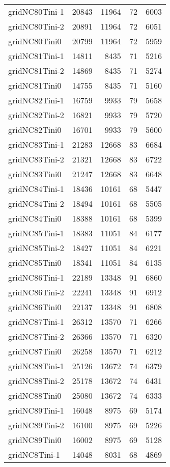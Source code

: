 \begin{longtable}{lrrrr}
gridNC80Tini-1 & 20843 & 11964 & 72 & 6003 \\
gridNC80Tini-2 & 20891 & 11964 & 72 & 6051 \\
gridNC80Tini0 & 20799 & 11964 & 72 & 5959 \\
gridNC81Tini-1 & 14811 & 8435 & 71 & 5216 \\
gridNC81Tini-2 & 14869 & 8435 & 71 & 5274 \\
gridNC81Tini0 & 14755 & 8435 & 71 & 5160 \\
gridNC82Tini-1 & 16759 & 9933 & 79 & 5658 \\
gridNC82Tini-2 & 16821 & 9933 & 79 & 5720 \\
gridNC82Tini0 & 16701 & 9933 & 79 & 5600 \\
gridNC83Tini-1 & 21283 & 12668 & 83 & 6684 \\
gridNC83Tini-2 & 21321 & 12668 & 83 & 6722 \\
gridNC83Tini0 & 21247 & 12668 & 83 & 6648 \\
gridNC84Tini-1 & 18436 & 10161 & 68 & 5447 \\
gridNC84Tini-2 & 18494 & 10161 & 68 & 5505 \\
gridNC84Tini0 & 18388 & 10161 & 68 & 5399 \\
gridNC85Tini-1 & 18383 & 11051 & 84 & 6177 \\
gridNC85Tini-2 & 18427 & 11051 & 84 & 6221 \\
gridNC85Tini0 & 18341 & 11051 & 84 & 6135 \\
gridNC86Tini-1 & 22189 & 13348 & 91 & 6860 \\
gridNC86Tini-2 & 22241 & 13348 & 91 & 6912 \\
gridNC86Tini0 & 22137 & 13348 & 91 & 6808 \\
gridNC87Tini-1 & 26312 & 13570 & 71 & 6266 \\
gridNC87Tini-2 & 26366 & 13570 & 71 & 6320 \\
gridNC87Tini0 & 26258 & 13570 & 71 & 6212 \\
gridNC88Tini-1 & 25126 & 13672 & 74 & 6379 \\
gridNC88Tini-2 & 25178 & 13672 & 74 & 6431 \\
gridNC88Tini0 & 25080 & 13672 & 74 & 6333 \\
gridNC89Tini-1 & 16048 & 8975 & 69 & 5174 \\
gridNC89Tini-2 & 16100 & 8975 & 69 & 5226 \\
gridNC89Tini0 & 16002 & 8975 & 69 & 5128 \\
gridNC8Tini-1 & 14048 & 8031 & 68 & 4869 \\

\end{longtable}
